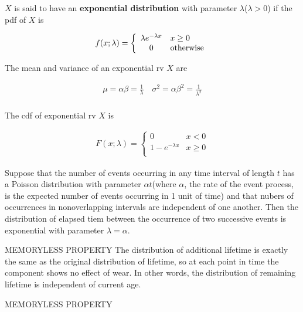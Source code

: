 \begin{definition}
    $X$ is said to have an \textbf{exponential distribution} with parameter $\lambda$($\lambda > 0$) if the pdf of $X$ is

    \begin{align*}
        f(x;\lambda) = \left\{\begin{array}{cl}
            \lambda e^{-\lambda x} & x\geq 0 \\
            0 & {\rm otherwise} \\
        \end{array}\right.
    \end{align*}
\end{definition}

\begin{proposition}
    The mean and variance of an exponential rv $X$ are

    \begin{align*}
        \mu = \alpha\beta = \frac{1}{\lambda}\quad \sigma^2 = \alpha\beta^2=\frac{1}{\lambda^2} \\
    \end{align*}

    The cdf of exponential rv $X$ is 

    \begin{align*}
        F(x;\lambda) = \left\{\begin{array}{cl}
            0 & x<0 \\
            1 - e^{-\lambda x} & x\geq 0 \\
        \end{array}\right.
    \end{align*}
\end{proposition}

\begin{proposition}
    Suppose that the number of events occurring in any time interval of length $t$ has a Poisson distribution with parameter $\alpha t$(where $\alpha$, the rate of the event process, is the expected number of events occurring in 1 unit of time) and that nubers of occurrences in nonoverlapping intervals are independent of one another. Then the distribution of elapsed tiem between the occurrence of two successive events is exponential with parameter $\lambda = \alpha$.
\end{proposition}

\begin{proposition}{MEMORYLESS PROPERTY}
    The distribution of additional lifetime is exactly the same as the original distribution of lifetime, so at each point in time the component shows no effect of wear. In other words, the distribution of remaining lifetime is independent of current age.
\end{proposition}{MEMORYLESS PROPERTY}


